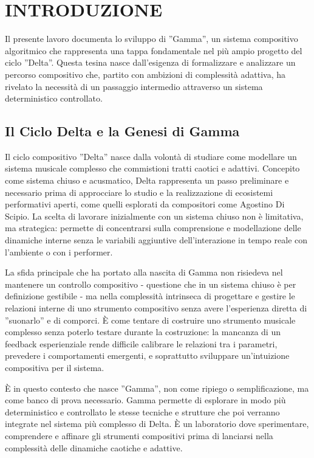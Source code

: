 
\section{INTRODUZIONE}
Il presente lavoro documenta lo sviluppo di ''Gamma'', un sistema compositivo algoritmico che rappresenta una tappa fondamentale nel più ampio progetto del ciclo ''Delta''. Questa tesina nasce dall'esigenza di formalizzare e analizzare un percorso compositivo che, partito con ambizioni di complessità adattiva, ha rivelato la necessità di un passaggio intermedio attraverso un sistema deterministico controllato.
\subsection{Il Ciclo Delta e la Genesi di Gamma}
Il ciclo compositivo ''Delta'' nasce dalla volontà di studiare come modellare un sistema musicale complesso che commistioni tratti caotici e adattivi. Concepito come sistema chiuso e acusmatico, Delta rappresenta un passo preliminare e necessario prima di approcciare lo studio e la realizzazione di ecosistemi performativi aperti, come quelli esplorati da compositori come Agostino Di Scipio. La scelta di lavorare inizialmente con un sistema chiuso non è limitativa, ma strategica: permette di concentrarsi sulla comprensione e modellazione delle dinamiche interne senza le variabili aggiuntive dell'interazione in tempo reale con l'ambiente o con i performer.

La sfida principale che ha portato alla nascita di Gamma non risiedeva nel mantenere un controllo compositivo - questione che in un sistema chiuso è per definizione gestibile - ma nella complessità intrinseca di progettare e gestire le relazioni interne di uno strumento compositivo senza avere l'esperienza diretta di ''suonarlo'' e di comporci. È come tentare di costruire uno strumento musicale complesso senza poterlo testare durante la costruzione: la mancanza di un feedback esperienziale rende difficile calibrare le relazioni tra i parametri, prevedere i comportamenti emergenti, e soprattutto sviluppare un'intuizione compositiva per il sistema.

È in questo contesto che nasce ''Gamma'', non come ripiego o semplificazione, ma come banco di prova necessario. Gamma permette di esplorare in modo più deterministico e controllato le stesse tecniche e strutture che poi verranno integrate nel sistema più complesso di Delta. È un laboratorio dove sperimentare, comprendere e affinare gli strumenti compositivi prima di lanciarsi nella complessità delle dinamiche caotiche e adattive.

